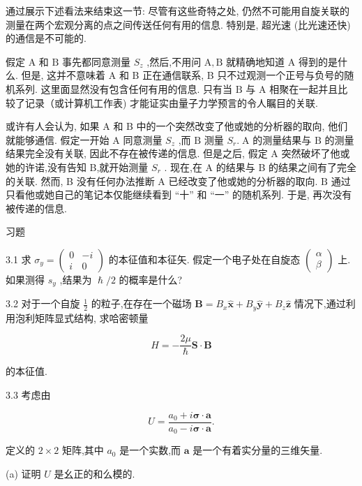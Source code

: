 通过展示下述看法来结束这一节: 尽管有这些奇特之处, 仍然不可能用自旋关联的测量在两个宏观分离的点之间传送任何有用的信息. 特别是, 超光速 (比光速还快) 的通信是不可能的.

假定 $\mathrm{A}$ 和 $\mathrm{B}$ 事先都同意测量 ${S}_{z}$ ,然后,不用问 $\mathrm{A},\mathrm{B}$ 就精确地知道 $\mathrm{A}$ 得到的是什么. 但是, 这并不意味着 A 和 B 正在通信联系, B 只不过观测一个正号与负号的随机系列. 这里面显然没有包含任何有用的信息. 只有当 $\mathrm{B}$ 与 $\mathrm{A}$ 相聚在一起并且比较了记录（或计算机工作表) 才能证实由量子力学预言的令人瞩目的关联.

或许有人会认为, 如果 A 和 B 中的一个突然改变了他或她的分析器的取向, 他们就能够通信. 假定一开始 $\mathrm{A}$ 同意测量 ${S}_{z}$ ,而 $\mathrm{B}$ 测量 ${S}_{r}.\mathrm{\;A}$ 的测量结果与 $\mathrm{B}$ 的测量结果完全没有关联, 因此不存在被传递的信息. 但是之后, 假定 $\mathrm{A}$ 突然破坏了他或她的许诺,没有告知 B,就开始测量 ${S}_{r}$ . 现在,在 A 的结果与 B 的结果之间有了完全的关联. 然而, B 没有任何办法推断 $\mathrm{A}$ 已经改变了他或她的分析器的取向. $\mathrm{B}$ 通过只看他或她自己的笔记本仅能继续看到 “十” 和 “一” 的随机系列. 于是, 再次没有被传递的信息.



习题

3.1 求 ${\sigma }_{y} = \left( \begin{matrix} 0 & - i \\ i & 0 \end{matrix}\right)$ 的本征值和本征矢. 假定一个电子处在自旋态 $\left( \begin{array}{l} \alpha \\ \beta \end{array}\right)$ 上. 如果测得 ${s}_{y}$ ,结果为 $\hslash /2$ 的概率是什么?

3.2 对于一个自旋 $\frac{1}{2}$ 的粒子,在存在一个磁场 $\mathbf{B} = {B}_{x}\widehat{\mathbf{x}} + {B}_{y}\widehat{\mathbf{y}} + {B}_{z}\widehat{\mathbf{z}}$ 情况下,通过利用泡利矩阵显式结构, 求哈密顿量

$$
H = - \frac{2\mu }{\hslash }\mathbf{S} \cdot \mathbf{B}
$$

的本征值.

3.3 考虑由

$$
U = \frac{{a}_{0} + i\mathbf{\sigma } \cdot \mathbf{a}}{{a}_{0} - i\mathbf{\sigma } \cdot \mathbf{a}}.
$$

定义的 $2 \times 2$ 矩阵,其中 ${a}_{0}$ 是一个实数,而 $\mathbf{a}$ 是一个有着实分量的三维矢量.

(a) 证明 $U$ 是幺正的和么模的.

